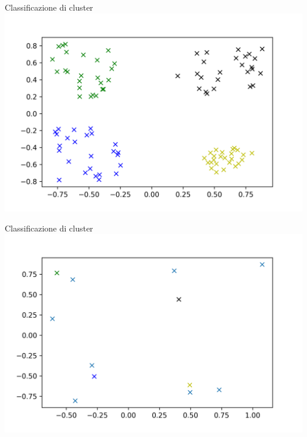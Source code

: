 \documentclass{beamer}
\begin{document}
    \begin{frame}{Classificazione di cluster}
        \includegraphics[width=\linewidth]{gfx/Clusters/cluster}
    \end{frame}

    \begin{frame}{Classificazione di cluster}
        \includegraphics[width=\linewidth]{gfx/Clusters/random}
    \end{frame}
\end{document}
